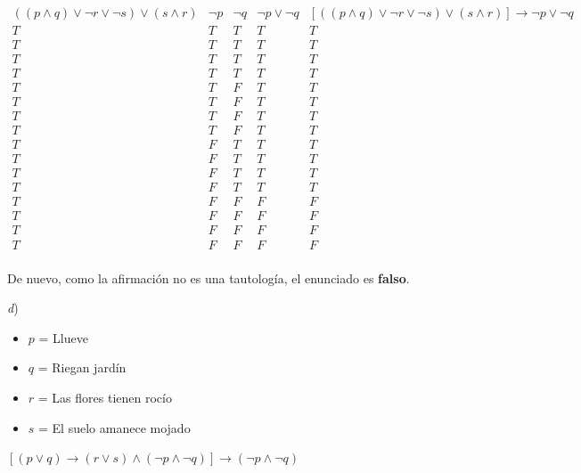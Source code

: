 \documentclass[11pt,a4paper]{article}
\begin{document}
\begin{enumerate}

\begin{displaymath}
\begin{array}{|c|c|c|c|c|}
((p \wedge q) \vee \neg r \vee \neg s) \vee (s \wedge r) & \neg p & \neg q & \neg p \vee \neg q & [((p \wedge q) \vee \neg r \vee \neg s) \vee (s \wedge r)] \rightarrow \neg p \vee \neg q \\
\hline 
T & T & T & T & T\\
T & T & T & T & T\\
T & T & T & T & T\\
T & T & T & T & T\\
T & T & F & T & T\\
T & T & F & T & T\\
T & T & F & T & T\\
T & T & F & T & T\\
T & F & T & T & T\\
T & F & T & T & T\\
T & F & T & T & T\\
T & F & T & T & T\\
T & F & F & F & F\\
T & F & F & F & F\\
T & F & F & F & F\\
T & F & F & F & F\\

\end{array}
\end{displaymath}

De nuevo, como la afirmación no es una tautología, el enunciado es \textbf{falso}.

\vspace{0.5cm}


\textit{d})

\begin{itemize}
\item $p$ = Llueve
\item $q$ = Riegan jardín
\item $r$ = Las flores tienen rocío
\item  $s$ = El suelo amanece mojado
\end{itemize}

\begin{center}

$[(p \vee q) \rightarrow (r \vee s) \wedge (\neg p \wedge \neg q)] \rightarrow (\neg p \wedge \neg q)$


\end{center}
\end{enumerate}
\end{document}
